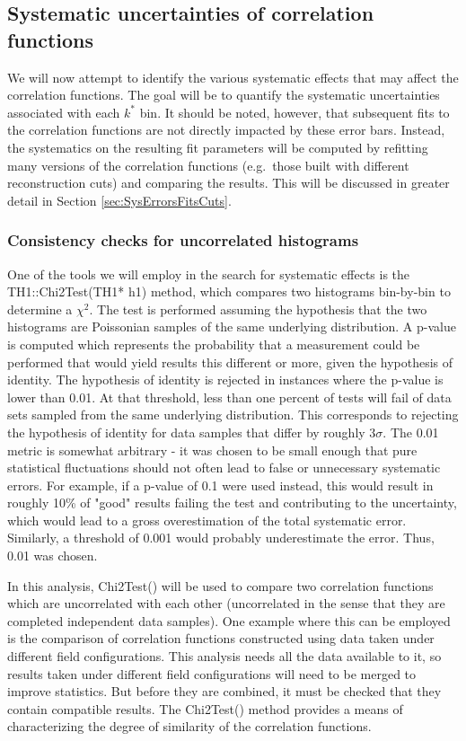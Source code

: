 \subsection{Systematic uncertainties of correlation functions}
\label{sec:SysUncertaintyCF}

We will now attempt to identify the various systematic effects that may affect the correlation functions.  
The goal will be to quantify the systematic uncertainties associated with each $k^*$ bin.  
It should be noted, however, that subsequent fits to the correlation functions are not directly impacted by these error bars.  
Instead, the systematics on the resulting fit parameters will be computed by refitting many versions of the correlation functions (e.g.\ those built with different reconstruction cuts) and comparing the results. 
This will be discussed in greater detail in Section \ref{sec:SysErrorsFitsCuts}.

\subsubsection{Consistency checks for uncorrelated histograms}
\label{sec:ConsistencyCheckUncorrelated}
One of the tools we will employ in the search for systematic effects is the TH1::Chi2Test(TH1* h1) method, which compares two histograms bin-by-bin to determine a $\chi^2$.  
The test is performed assuming the hypothesis that the two histograms are Poissonian samples of the same underlying distribution.  
A p-value is computed which represents the probability that a measurement could be performed that would yield results this different or more, given the hypothesis of identity.  
The hypothesis of identity is rejected in instances where the p-value is lower than 0.01. 
At that threshold, less than one percent of tests will fail of data sets sampled from the same underlying distribution.  
This corresponds to rejecting the hypothesis of identity for data samples that differ by roughly $3 \sigma$.  
The 0.01 metric is somewhat arbitrary - it was chosen to be small enough that pure statistical fluctuations should not often lead to false or unnecessary systematic errors.  
For example, if a p-value of 0.1 were used instead, this would result in roughly 10\% of "good" results failing the test and contributing to the uncertainty, which would lead to a gross overestimation of the total systematic error.  
Similarly, a threshold of 0.001 would probably underestimate the error.  
Thus, 0.01 was chosen.

In this analysis, Chi2Test() will be used to compare two correlation functions which are uncorrelated with each other (uncorrelated in the sense that they are completed independent data samples).  
One example where this can be employed is the comparison of correlation functions constructed using data taken under different field configurations.  
This analysis needs all the data available to it, so results taken under different field configurations will need to be merged to improve statistics.  
But before they are combined, it must be checked that they contain compatible results.  
The Chi2Test() method provides a means of characterizing the degree of similarity of the correlation functions.  

